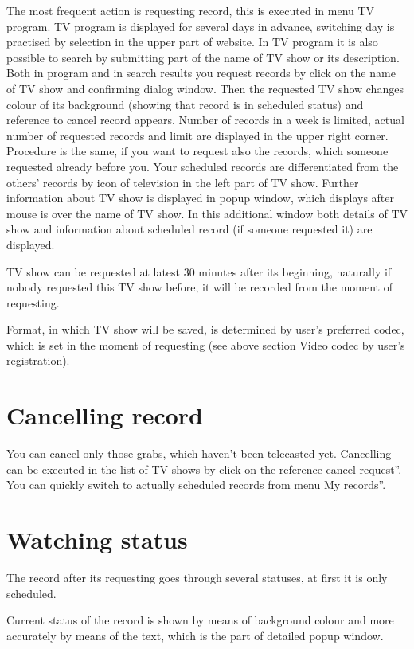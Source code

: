 The most frequent action is requesting record, this is executed in menu TV program. TV program is displayed for several days in advance, switching day is practised by selection in the upper part of website. In TV program it is also possible to search by submitting part of the name of TV show or its description. Both in program and in search results you request records by click on the name of TV show and confirming dialog window. Then the requested TV show changes colour of its background (showing that record is in scheduled status) and reference to cancel record appears. Number of records in a week is limited, actual number of requested records and limit are displayed in the upper right corner. Procedure is the same, if you want to request also the records, which someone requested already before you. Your scheduled records are differentiated from the others' records by icon of television in the left part of TV show. Further information about TV show is displayed in popup window, which displays after mouse is over the name of TV show. In this additional window both details of TV show and information about scheduled record (if someone requested it) are displayed.

TV show can be requested at latest 30 minutes after its beginning, naturally if nobody requested this TV show before, it will be recorded from the moment of requesting.

Format, in which TV show will be saved, is determined by user's preferred codec, which is set in the moment of requesting (see above section Video codec by user's registration).

\section{Cancelling record}

You can cancel only those grabs, which haven't been telecasted yet. Cancelling can be executed in the list of TV shows by click on the reference \quotedblbase cancel request''. You can quickly switch to actually scheduled records from menu \quotedblbase My records''.

\section{Watching status}

The record after its requesting goes through several statuses, at first it is only scheduled.

Current status of the record is shown by means of background colour and more accurately by means of the text, which is the part of detailed popup window.

